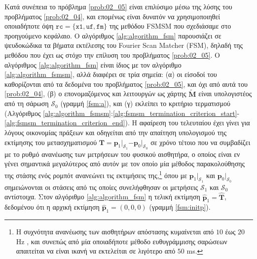 Κατά συνέπεια το πρόβλημα \ref{prob:02_05} είναι επιλύσιμο μέσω της λύσης του
προβλήματος \ref{prob:02_04}, και επομένως είναι δυνατόν να χρησιμοποιηθεί
οποιαδήποτε όψη $\texttt{rc} = \{\texttt{x1}, \texttt{uf}, \texttt{fm}\}$ της
μεθόδου FSMSM που σχεδιάσαμε στο προηγούμενο κεφάλαιο. Ο αλγόριθμος
\ref{alg:algorithm_fsm} παρουσιάζει σε ψευδοκώδικα τα βήματα εκτέλεσης του
Fourier Scan Matcher (FSM), δηλαδή της μεθόδου που έχει ως στόχο την επίλυση
του προβλήματος \ref{prob:02_05}. Ο αλγόριθμος \ref{alg:algorithm_fsm} είναι
ίδιος με τον αλγόριθμο \ref{alg:algorithm_fsmsm}, αλλά διαφέρει σε τρία σημεία:
(α) οι είσοδοί του καθορίζονται από τα δεδομένα του προβλήματος
\ref{prob:02_05}, και όχι από αυτά του \ref{prob:02_04}, (β) ο επονομαζόμενος
και λειτουργών ως χάρτης $\widetilde{\bm{M}}$ είναι υπολογιστέος από τη σάρωση
$\mathcal{S}_0$ (γραμμή \ref{fsm:a}), και (γ) εκλείπει το κριτήριο τερματισμού
(Αλγόριθμος
\ref{alg:algorithm_fsmsm}:\ref{alg:fsmsm_termination_criterion_start}-\ref{alg:fsmsm_termination_criterion_end}).
Η αφαίρεση του τελευταίου έχει γίνει για λόγους οικονομίας πράξεων και
οδηγείται από την απαίτηση υπολογισμού της εκτίμησης του μετασχηματισμού
$\bm{T} = \bm{p}_1$$|_{\mathcal{S}_1}$$ - \bm{p}_0$$|_{\mathcal{S}_0}$ σε χρόνο
τέτοιο που να συμβαδίζει με το ρυθμό ανανέωσης των μετρήσεων του φυσικού
αισθητήρα, ο οποίος είναι εν γένει σημαντικά μεγαλύτερος από αυτόν με τον οποίο
μία μέθοδος παρακολούθησης της στάσης ενός ρομπότ ανανεώνει τις εκτιμήσεις
της,\footnote{Η συχνότητα ανανέωσης των αισθητήρων απόστασης κυμαίνεται από
$10$ έως $20$ Hz \cite{velodyne_datasheet,a2m8_datasheet,ydlidar}, και συνεπώς
από μία οποιαδήποτε μέθοδο ευθυγράμμισης σαρώσεων απαιτείται να είναι ικανή να
εκτελείται σε λιγότερο από $50$ ms.} όπου με $\bm{p}_1$$|_{\mathcal{S}_1}$ και
$\bm{p}_0$$|_{\mathcal{S}_0}$ σημειώνονται οι στάσεις από τις οποίες
συνελήφθησαν οι μετρήσεις $\mathcal{S}_1$ και $\mathcal{S}_0$ αντίστοιχα.  Στον
αλγόριθμο \ref{alg:algorithm_fsm} η τελική εκτίμηση $\hat{\bm{p}}_1 =
\hat{\bm{T}}$, δεδομένου ότι η αρχική εκτίμηση $\hat{\bm{p}}_1 = (0,0,0)$
(γραμμή \ref{fsm:initp}).


